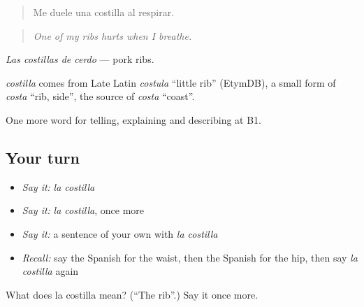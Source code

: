 \begin{quote}
Me duele una costilla al respirar.
\end{quote}

\begin{quote}
\emph{One of my ribs hurts when I breathe.}
\end{quote}

\emph{Las costillas de cerdo} — pork ribs.

\begin{cousinweb}
\emph{costilla} comes from Late Latin \emph{costula} \textquotedblleft{}little rib\textquotedblright{} (EtymDB), a small form of \emph{costa} \textquotedblleft{}rib, side\textquotedblright{}, the source of \emph{costa} \textquotedblleft{}coast\textquotedblright{}.
\end{cousinweb}

\begin{grammarlens}[title={What you've built}]
One more word for telling, explaining and describing at B1.
\end{grammarlens}

\subsection*{Your turn}
\begin{itemize}
\raggedright
  \item \emph{Say it:} \emph{la costilla}
  \item \emph{Say it:} \emph{la costilla}, once more
  \item \emph{Say it:} a sentence of your own with \emph{la costilla}
  \item \emph{Recall:} say the Spanish for the waist, then the Spanish for the hip, then say \emph{la costilla} again
\end{itemize}

\begin{tcolorbox}[breakable,colback=teal!4,colframe=teal!35!black,title={Before you move on}]
What does la costilla mean? (\textquotedblleft{}The rib\textquotedblright{}.) Say it once more.
\end{tcolorbox}
